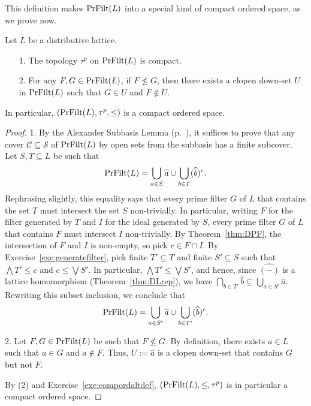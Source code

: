 This definition makes $\mathrm{PrFilt}(L)$ into a special kind of compact ordered space, as we prove now.
\begin{proposition}\label{prop:priestleycompactord}
Let $L$ be a distributive lattice.
\begin{enumerate}
\item[1.] The topology $\tau^p$ on $\mathrm{PrFilt}(L)$ is compact.
\item[2.] For any $F, G \in \mathrm{PrFilt}(L)$, if $F \nleq G$, then there exists a clopen down-set $U$ in $\mathrm{PrFilt}(L)$ such that $G \in U$ and $F \not\in U$.
\end{enumerate}
In particular, $(\mathrm{PrFilt}(L),\tau^p,\leq)$ is a compact ordered space.
\end{proposition}
\begin{proof}
  1. By the Alexander Subbasis Lemma (p.~\pageref{lem:alexander}), it suffices to prove that any cover $\mathcal{C} \subseteq \mathcal{S}$ of $\mathrm{PrFilt}(L)$ by open sets from the subbasis has a finite subcover. Let $S, T \subseteq L$ be such that
\[ \mathrm{PrFilt}(L) = \bigcup_{a \in S} \widehat{a} \cup \bigcup_{b \in T} (\widehat{b})^c.\]
Rephrasing slightly, this equality says that every prime filter $G$ of $L$ that contains the set $T$ must intersect the set $S$ non-trivially. In particular, writing $F$ for the filter generated by $T$ and $I$ for the ideal generated by $S$, every prime filter $G$ of $L$ that contains $F$ must intersect $I$ non-trivially. By Theorem~\ref{thm:DPF}, the intersection of $F$ and $I$ is non-empty, so pick $c \in F \cap I$. By Exercise~\ref{exe:generatefilter}, pick finite $T' \subseteq T$ and finite $S' \subseteq S$ such that $\bigwedge T' \leq c$ and $c \leq \bigvee S'$. In particular, $\bigwedge T' \leq \bigvee S'$, and hence, since $\widehat{(-)}$ is a lattice homomorphism (Theorem~\ref{thm:DLrep}), we have $\bigcap_{b \in T'} \widehat{b} \subseteq \bigcup_{a \in S'} \widehat{a}$. Rewriting this subset inclusion, we conclude that
\[ \mathrm{PrFilt}(L) = \bigcup_{a \in S'} \widehat{a} \cup \bigcup_{b \in T'} (\widehat{b})^c.\]

2. Let $F,G \in \mathrm{PrFilt}(L)$ be such that $F \nleq G$. By definition, there exists $a \in L$ such that $a \in G$ and $a \not\in F$. Thus, $U := \widehat{a}$ is a clopen down-set that contains $G$ but not $F$.

By (2) and Exercise~\ref{exe:compordaltdef}, $(\mathrm{PrFilt}(L),\leq,\tau^p)$ is in particular a compact ordered space.
\end{proof}

